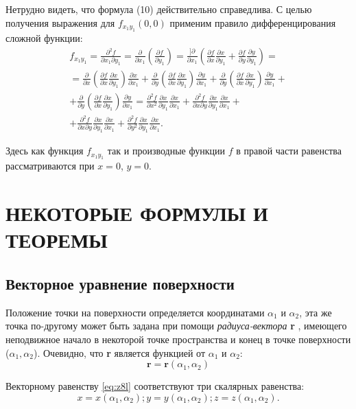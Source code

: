 \documentclass[a4paper,12pt]{article}
\begin{document}
	Нетрудно видеть, что формула (10) действительно справедлива. С целью получения выражения для $f_{x_1 y_1}(0,0)$ применим правило дифференцирования сложной функции:
	\begin{equation}
	\begin{gathered}
		f_{x_1 y_1}=\frac{\partial^2 f}{\partial x_1 \partial y_1}=\frac{\partial}{\partial x_1}\left(\frac{\partial f}{\partial y_1} \right)=\frac{]\partial}{\partial x_1}\left(\frac{\partial f}{\partial x}\frac{\partial x}{\partial y_1} + \frac{\partial f}{\partial y}\frac{\partial y}{\partial y_1} \right) = \\ = 
		\frac{\partial}{\partial x} \left( \frac{\partial f}{\partial x}\frac{\partial x}{\partial y_1} \right)\frac{\partial x}{\partial x_1} +  \frac{\partial}{\partial y} \left( \frac{\partial f}{\partial x}\frac{\partial x}{\partial y_1} \right)  \frac{\partial y}{\partial x_1} + \frac{\partial}{\partial y} \left( \frac{\partial f}{\partial x}\frac{\partial x}{\partial y_1} \right)  \frac{\partial y}{\partial x_1} + \\ +
		\frac{\partial}{\partial y} \left( \frac{\partial f}{\partial x}\frac{\partial x}{\partial y_1} \right)  \frac{\partial y}{\partial x_1} = \frac{\partial^2 f}{\partial x^2} \frac{\partial x}{\partial y_1} \frac{\partial x}{\partial x_1} + \frac{\partial^2 f}{\partial x \partial y} \frac{\partial x}{\partial y_1} \frac{\partial x}{\partial x_1} + \\ +
		\frac{\partial^2 f}{\partial x \partial y} \frac{\partial x}{\partial y_1} \frac{\partial x}{\partial x_1} + \frac{\partial^2 f}{\partial y^2} \frac{\partial x}{\partial y_1} \frac{\partial x}{\partial x_1}.
	\end{gathered}
	\end{equation}
	
	Здесь как функция $f_{x_1 y_1}$ так и производные функции $f$ в правой части равенства рассматриваются при $x=0$, $y=0$.

	\section{НЕКОТОРЫЕ ФОРМУЛЫ И ТЕОРЕМЫ}
	\subsection{Векторное уравнение поверхности}
	Положение точки на поверхности определяется координатами $\alpha_1$ и $\alpha_2$, эта же точка по-другому может быть задана при помощи \textit{радиуса-вектора} \textbf{r} , имеющего неподвижное начало в некоторой точке пространства и конец в точке поверхности ($\alpha_1, \alpha_2$). Очевидно, что \textbf{r} является функцией от $\alpha_1$ и $\alpha_2$:
	\begin{equation}
		\label{eq:z8l}
		\textbf{r} = \textbf{r}(\alpha_1, \alpha_2)
	\end{equation}
	
	Векторному равенству \eqref{eq:z8l} соответствуют три скалярных равенства:
	\begin{displaymath}
		x=x(\alpha_1, \alpha_2); y=y(\alpha_1, \alpha_2); z=z(\alpha_1, \alpha_2).
	\end{displaymath}
\end{document}
